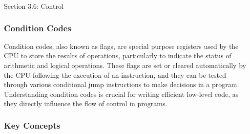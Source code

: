 \begin{notes}{Section 3.6: Control}
    \subsubsection*{Condition Codes}

    Condition codes, also known as flags, are special purpose registers used by the CPU to store the results of operations, particularly to indicate the status of arithmetic and logical operations. 
    These flags are set or cleared automatically by the CPU following the execution of an instruction, and they can be tested through various conditional jump instructions to make decisions in a 
    program. Understanding condition codes is crucial for writing efficient low-level code, as they directly influence the flow of control in programs. \vspace*{1em}
    
    \subsubsection*{Key Concepts}
    

\end{notes}
